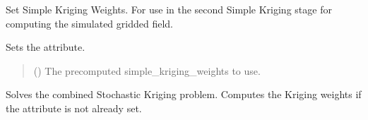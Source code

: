 \documentclass[letterpaper,10pt,english]{sphinxmanual}
\begin{document}
\begin{fulllineitems}
\begin{fulllineitems}
\end{fulllineitems}


\begin{fulllineitems}
\label{\detokenize{kriging:glomar_gridding.stochastic.StochasticKriging.set_simple_kriging_weights}}
\pysigstartsignatures
\pysiglinewithargsret
{}
{}
{}
\pysigstopsignatures
\sphinxAtStartPar
Set Simple Kriging Weights. For use in the second Simple Kriging stage
for computing the simulated gridded field.

\sphinxAtStartPar
Sets the  attribute.
\begin{quote}\begin{description}
\sphinxAtStartPar
{} () \textendash{} The pre\sphinxhyphen{}computed simple\_kriging\_weights to use.

\sphinxAtStartPar
{}

\end{description}\end{quote}

\end{fulllineitems}


\begin{fulllineitems}
\label{\detokenize{kriging:glomar_gridding.stochastic.StochasticKriging.solve}}
\pysigstartsignatures
\pysiglinewithargsret
{}
{\sphinxparamcomma {}\sphinxparamcomma {}\sphinxparamcomma {}}
{}
\pysigstopsignatures
\sphinxAtStartPar
Solves the combined Stochastic Kriging problem. Computes the Kriging
weights if the  attribute is not already set.


\end{fulllineitems}
\end{fulllineitems}
\end{document}
